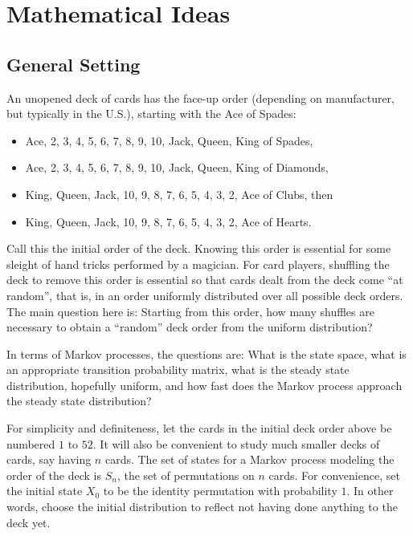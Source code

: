 \documentclass[12pt]{article}
\begin{document}
\hr

\section*{Mathematical Ideas}

\subsection*{General Setting}

An unopened deck of cards has the face-up order (depending on manufacturer,
but typically in the U.S.), 
starting with the Ace of Spades:
\begin{itemize}
\item Ace, 2, 3, 4, 5, 6, 7, 8, 9, 10, Jack, Queen, King of Spades,
\item Ace, 2, 3, 4, 5, 6, 7, 8, 9, 10, Jack, Queen, King of Diamonds,
\item King, Queen, Jack, 10, 9, 8, 7, 6, 5, 4, 3, 2, Ace of Clubs,
  then
\item King, Queen, Jack, 10, 9, 8, 7, 6, 5, 4, 3, 2, Ace of Hearts.
\end{itemize}
Call this the initial order of the deck.  Knowing this order is
essential for some sleight of hand tricks performed by a
magician.  For card players, shuffling the deck to remove this order
is essential so that cards dealt from the deck come ``at random'',
that is, in an order uniformly distributed over all possible deck orders.
The main question here is: Starting from this order, how many shuffles are
necessary to obtain a ``random'' deck order from the uniform distribution?

In terms of Markov processes, the questions are: What is the state
space, what is an appropriate transition probability matrix, what is
the  steady state distribution, hopefully uniform, and how fast does
the Markov process approach the steady state distribution?

For simplicity and definiteness, let the cards in the initial deck order above be
numbered \( 1 \) to \( 52 \).  It will also be convenient to study much
smaller decks of cards, say having \( n \) cards.  The set of states for a Markov process
modeling the order of the deck is \( S_n \), the set of permutations on \( n \)
cards.  For convenience, set the initial state \( X_0
\) to be the identity permutation with probability \( 1 \).  In other
words, choose the initial distribution to reflect not having done
anything to the deck yet.
\end{document}
